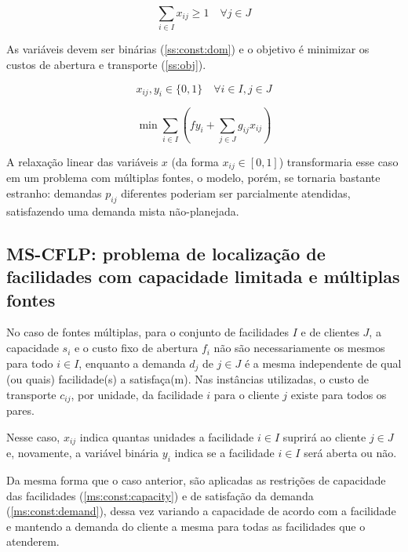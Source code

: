 \documentclass[]{article}
\begin{document}
	\begin{equation}
		\label{ss:const:demand}		
		\sum_{i \in I} x_{ij} \ge 1 
		\quad
		\forall j \in J
	\end{equation}

	As variáveis devem ser binárias (\ref{ss:const:dom}) 
	e o objetivo é minimizar os custos de abertura e transporte (\ref{ss:obj}).
	
	\begin{equation}
		\label{ss:const:dom}		
		x_{ij}, y_i \in \{0, 1\}
		\quad
		\forall i \in I, j \in J
	\end{equation}	
	
	\begin{equation}
		\label{ss:obj}		
		\min \sum_{i \in I} 
		(
			f y_i + \sum_{j \in J} g_{ij} x_{ij}
		)
	\end{equation}

	A relaxação linear das variáveis $x$ (da forma $x_{ij} \in [0,1]$) transformaria esse caso em um problema com múltiplas fontes, 
	o modelo, porém, se tornaria bastante estranho:  
	demandas $p_{ij}$ diferentes poderiam ser parcialmente atendidas, satisfazendo uma demanda mista não-planejada.
	
\subsection{MS-CFLP: problema de localização de facilidades com capacidade limitada e múltiplas fontes}
	

 
	No caso de fontes múltiplas, para o conjunto de facilidades $I$ e de clientes $J$, 
	a capacidade $s_i$ e o custo fixo de abertura $f_i$ não são necessariamente os mesmos para todo $i \in I$, 
	enquanto a demanda $d_j$ de $j \in J$ é a mesma
	independente de qual (ou quais) facilidade(s) a satisfaça(m). 
	Nas instâncias utilizadas, o custo de transporte $c_{ij}$, por unidade, da facilidade $i$ para o cliente $j$ existe para todos os pares.
	
	Nesse caso, $x_{ij}$ indica quantas unidades a facilidade $i \in I$ suprirá ao cliente $j \in J$ 
	e, novamente, a variável binária $y_i$ indica se a facilidade $i \in I$ será aberta ou não.

    
	
	Da mesma forma que o caso anterior, são aplicadas as restrições de capacidade das facilidades (\ref{ms:const:capacity}) e de satisfação da demanda (\ref{ms:const:demand}), dessa vez variando a capacidade de acordo com a facilidade e mantendo a demanda do cliente a mesma para todas as facilidades que o atenderem.
	
\end{document}
